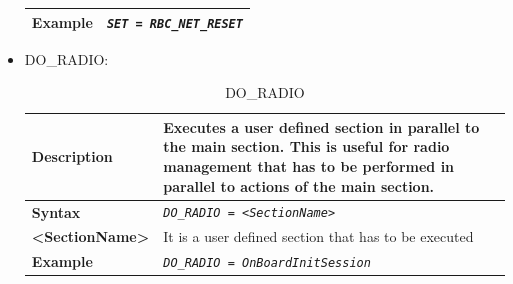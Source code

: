 \documentclass{template/openetcs}
\begin{document}
\begin{itemize}
\begin{longtable}{|l|l|l|}
				\hline
															
					\begin{minipage}[t]{0.22\linewidth} \textbf{Example} \end{minipage}
				&	\multicolumn{2}{l|}{ \begin{minipage}[t]{0.78\linewidth} \emph{\texttt{SET = RBC\_NET\_RESET}} \end{minipage} } \\
				
				\hline \hline
				
			\end{longtable}
			
		\item DO\_RADIO:									
			
			\begin{longtable}{|l|l|}
				\caption{DO\_RADIO}\\ 
				\hline
				
					\begin{minipage}[t]{0.22\linewidth} \textbf{Description} \end{minipage} 
				&	\begin{minipage}[t]{0.78\linewidth} Executes a user defined section in parallel to the main section. This is useful for radio management that has to be performed in parallel to actions of the main section. \end{minipage} \\
												
				\hline
								
					\begin{minipage}[t]{0.22\linewidth} \textbf{Syntax}	\end{minipage}
				&	\begin{minipage}[t]{0.78\linewidth }\emph{\texttt{DO\_RADIO = <SectionName>}} \end{minipage} \\
				
				\hline
				
					\begin{minipage}[t]{0.22\linewidth} \textbf{<SectionName>} \end{minipage}
				&	\begin{minipage}[t]{0.78\linewidth} It is a user defined section that has to be executed \end{minipage} \\
				
				\hline
															
					\begin{minipage}[t]{0.22\linewidth} \textbf{Example} \end{minipage}
				&	\begin{minipage}[t]{0.78\linewidth}	\emph{\texttt{DO\_RADIO = OnBoardInitSession}} \end{minipage} \\
				

\end{longtable}
\end{itemize}
\end{document}
